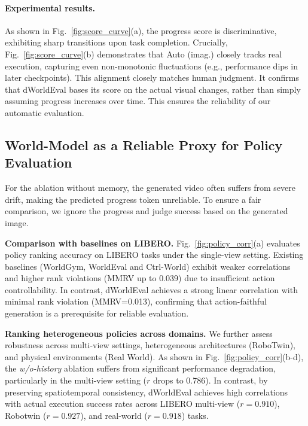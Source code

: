 \paragraph{Experimental results.} As shown in Fig.~\ref{fig:score_curve}(a), the progress score is discriminative, exhibiting sharp transitions upon task completion. Crucially, Fig.~\ref{fig:score_curve}(b) demonstrates that Auto (imag.) closely tracks real execution, capturing even non-monotonic fluctuations (e.g., performance dips in later checkpoints).
This alignment closely matches human judgment. It confirms that dWorldEval bases its score on the actual visual changes, rather than simply assuming progress increases over time. This ensures the reliability of our automatic evaluation.

\subsection{World-Model as a Reliable Proxy for Policy Evaluation}
\label{sec:policy_eval}

For the ablation without memory, the generated video often suffers from severe drift, making the predicted progress token unreliable. To ensure a fair comparison, we ignore the progress and judge success  based on the generated image.

\textbf{Comparison with baselines on LIBERO.}
Fig.~\ref{fig:policy_corr}(a) evaluates policy ranking accuracy on LIBERO tasks under the single-view setting.
Existing baselines (WorldGym, WorldEval and Ctrl-World) exhibit weaker correlations and higher rank violations (MMRV up to 0.039) due to insufficient action controllability.
In contrast, dWorldEval achieves a strong linear correlation with minimal rank violation (MMRV=0.013), confirming that action-faithful generation is a prerequisite for reliable evaluation.

\textbf{Ranking heterogeneous policies across domains.} 
We further assess robustness across multi-view settings, heterogeneous architectures (RoboTwin), and physical environments (Real World).
As shown in Fig.~\ref{fig:policy_corr}(b-d), the \textit{w/o-history} ablation suffers from significant performance degradation, particularly in the multi-view setting ($r$ drops to 0.786).
In contrast, by preserving spatiotemporal consistency, dWorldEval achieves high correlations with actual execution success rates across LIBERO multi-view ($r=0.910$), Robotwin ($r=0.927$), and real-world ($r=0.918$) tasks.

